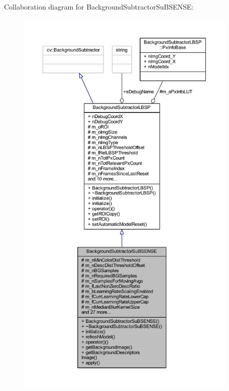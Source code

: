 Collaboration diagram for Background\+Subtractor\+Su\+B\+S\+E\+N\+SE\+:\nopagebreak
\begin{figure}[H]
\begin{center}
\leavevmode
\includegraphics[height=550pt]{class_background_subtractor_su_b_s_e_n_s_e__coll__graph}
\end{center}
\end{figure}
